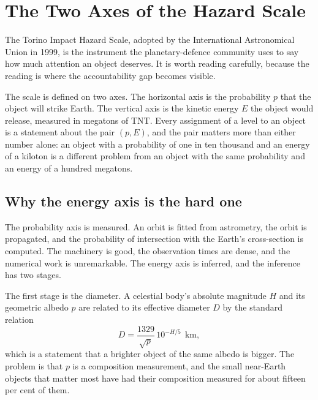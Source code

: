 
\chapter{The Two Axes of the Hazard Scale}
\label{ch:two-axes}

The Torino Impact Hazard Scale, adopted by the International Astronomical Union
in 1999, is the instrument the planetary-defence community uses to say how
much attention an object deserves. It is worth reading carefully, because the
reading is where the accountability gap becomes visible.

The scale is defined on two axes. The horizontal axis is the probability
\(p\) that the object will strike Earth. The vertical axis is the kinetic
energy \(E\) the object would release, measured in megatons of TNT. Every
assignment of a level to an object is a statement about the pair \((p, E)\),
and the pair matters more than either number alone: an object with a
probability of one in ten thousand and an energy of a kiloton is a different
problem from an object with the same probability and an energy of a hundred
megatons.

\section{Why the energy axis is the hard one}

The probability axis is measured. An orbit is fitted from astrometry, the
orbit is propagated, and the probability of intersection with the Earth's
cross-section is computed. The machinery is good, the observation times are
dense, and the numerical work is unremarkable. The energy axis is inferred,
and the inference has two stages.

The first stage is the diameter. A celestial body's absolute magnitude \(H\)
and its geometric albedo \(p\) are related to its effective diameter \(D\) by
the standard relation
\begin{equation}
D = \frac{1329}{\sqrt{p}}\,10^{-H/5}\ \ \mathrm{km},
\label{eq:hdp}
\end{equation}
which is a statement that a brighter object of the same albedo is bigger.
The problem is that \(p\) is a composition measurement, and the small
near-Earth objects that matter most have had their composition measured for
about fifteen per cent of them.

